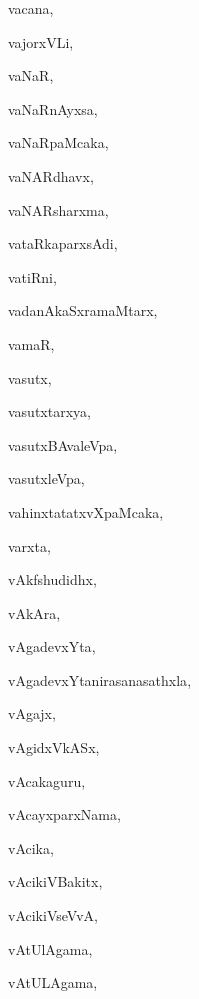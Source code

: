 \begin{multicols}{3}
{\noindent
{vacana}, \pageref{vacana}

\noindent
{vajorxVLi}, \pageref{vajorxVLi}

\noindent
{vaNaR}, \pageref{vaNaR}

\noindent
{vaNaRnAyxsa}, \pageref{vaNaRnAyxsa}

\noindent
{vaNaRpaMcaka}, \pageref{vaNaRpaMcaka}

\noindent
{vaNARdhavx}, \pageref{vaNARdhavx}

\noindent
{vaNARsharxma}, \pageref{vaNARsharxma}

\noindent
{vataRkaparxsAdi}, \pageref{vataRkaparxsAdi}

\noindent
{vatiRni}, \pageref{vatiRni}

\noindent
{vadanAkaSxramaMtarx}, \pageref{vadanAkaSxramaMtarx}

\noindent
{vamaR}, \pageref{vamaR}

\noindent
{vasutx}, \pageref{vasutx}

\noindent
{vasutxtarxya}, \pageref{vasutxtarxya}

\noindent
{vasutxBAvaleVpa}, \pageref{vasutxBAvaleVpa}

\noindent
{vasutxleVpa}, \pageref{vasutxleVpa}

\noindent
{vahinxtatatxvXpaMcaka}, \pageref{vahinxtatatxvXpaMcaka}

\noindent
{varxta}, \pageref{varxta}

\noindent
{vAkfshudidhx}, \pageref{vAkfshudidhx}

\noindent
{vAkAra}, \pageref{vAkAra}

\noindent
{vAgadevxYta}, \pageref{vAgadevxYta}

\noindent
{vAgadevxYtanirasanasathxla}, \pageref{vAgadevxYtanirasanasathxla}

\noindent
{vAgajx}, \pageref{vAgajx}

\noindent
{vAgidxVkASx}, \pageref{vAgidxVkASx}

\noindent
{vAcakaguru}, \pageref{vAcakaguru}

\noindent
{vAcayxparxNama}, \pageref{vAcayxparxNama}

\noindent
{vAcika}, \pageref{vAcika}

\noindent
{vAcikiVBakitx}, \pageref{vAcikiVBakitx}

\noindent
{vAcikiVseVvA}, \pageref{vAcikiVseVvA}

\noindent
{vAtUlAgama}, \pageref{vAtUlAgama}

\noindent
{vAtULAgama}, \pageref{vAtULAgama}

}
\end{multicols}
